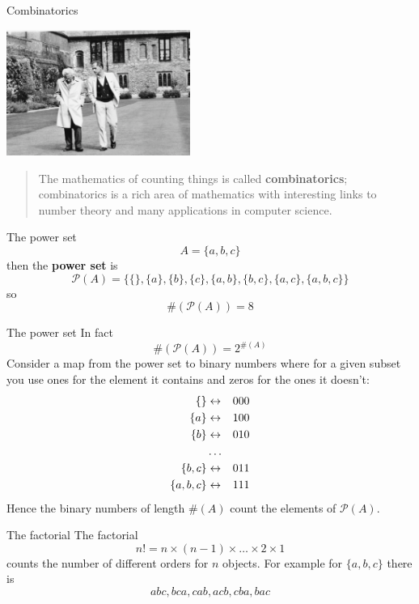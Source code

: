 \documentclass{beamer}
\newcommand{\crish}{\color{reddish}}
\newcommand{\cbla}{\color{black}}
\begin{document}
\begin{frame}{Combinatorics}
  \begin{center}
    \includegraphics[width=6cm]{Bollobas-Erdos.png}
    \end{center}
  \begin{quote}
    The mathematics of counting things is called \textbf{combinatorics};
combinatorics is a rich area of mathematics with interesting links to
number theory and many applications in computer science.
  \end{quote}
  \vfill
  \end{frame}

\begin{frame}{The power set}
\crish$$
  A=\{a,b,c\}
$$\cbla{}
then the \textbf{power set} is
\crish$$
    \mathcal{P}(A)=\{\{\},\{a\},\{b\},\{c\},\{a,b\},\{b,c\},\{a,c\},\{a,b,c\}\}
$$\cbla{}
so
\crish$$
  \#(\mathcal{P}(A))=8
  $$\cbla{}
\end{frame}

\begin{frame}{The power set}
  In fact
  \crish$$  \#(\mathcal{P}(A))=2^{\#(A)}$$\cbla{}
  Consider a map from the power set to binary numbers where for a given subset you use ones for the element it contains and zeros for the ones it doesn't:
  \crish
  \begin{eqnarray*}
  \{\}&\leftrightarrow&000\cr
  \{a\}&\leftrightarrow&100\cr
  \{b\}&\leftrightarrow&010\cr
  &\ldots&\cr
  \{b,c\}&\leftrightarrow&011\cr
  \{a,b,c\}&\leftrightarrow&111
\end{eqnarray*}
  \cbla{}
  Hence the binary numbers of length \crish$\#(A)$\cbla{} count the elements of \crish$\mathcal{P}(A)$\cbla{}.
  \end{frame}

\begin{frame}{The factorial}
  The factorial
  \crish$$n!=n\times(n-1)\times\ldots\times 2 \times 1$$\cbla{}
  counts the number of different orders for \crish$n$\cbla{} objects. For example for \crish$\{a,b,c\}$\cbla{} there is
  \crish$$abc, bca, cab, acb, cba, bac$$\cbla{}
  \end{frame}
\end{document}
